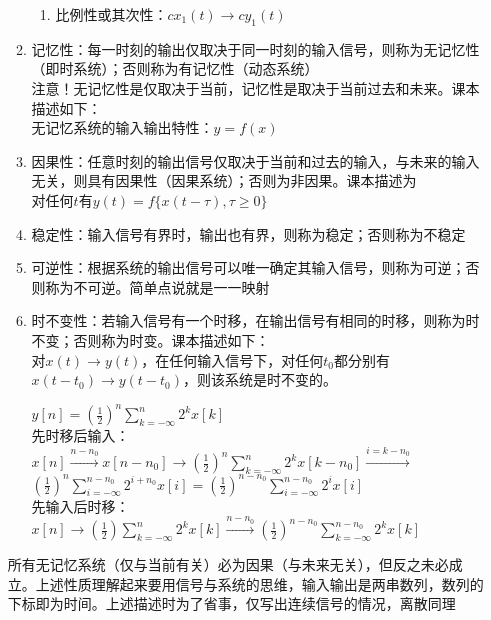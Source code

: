 \documentclass{article}
\begin{document}
\begin{enumerate}[label=(\arabic*)]
\begin{enumerate}[label=(\roman*)]
\begin{enumerate}[label=(\alph*)]
									\item 比例性或其次性：$cx_1(t)\to cy_1(t)$
								\end{enumerate}
					\item 记忆性：每一时刻的输出仅取决于同一时刻的输入信号，则称为{\red 无}记忆性（即时系统）；否则称为有记忆性（动态系统）\\
								{\red 注意！无记忆性是仅取决于当前，记忆性是取决于当前过去和未来}。课本描述如下：\\
								无记忆系统的输入输出特性：$y=f(x)$
					\item 因果性：任意时刻的输出信号仅取决于当前和过去的输入，与未来的输入无关，则具有因果性（因果系统）；否则为非因果。课本描述为\\
								对任何$t$有$y(t)=f\{x(t-\tau),\tau \geq 0\}$
					\item 稳定性：输入信号有界时，输出也有界，则称为稳定；否则称为不稳定
					\item 可逆性：根据系统的输出信号可以唯一确定其输入信号，则称为可逆；否则称为不可逆。简单点说就是一一映射
					\item 时不变性：若输入信号有一个时移，在输出信号有相同的时移，则称为时不变；否则称为时变。课本描述如下：\\
								对$x(t)\to y(t)$，在任何输入信号下，对任何$t_0$都分别有$x(t-t_0)\to y(t-t_0)$，则该系统是时不变的。
								\begin{example}
									$y[n] = (\frac{1}{2})^n\sum_{k=-\infty}^{n}2^kx[k]$\\
									先时移后输入：$x[n]\xrightarrow{n-n_0}x[n-n_0]\longrightarrow (\frac{1}{2})^n\sum_{k=-\infty}^{n}2^kx[k-n_0]\xrightarrow{i=k-n_0}$\\
									$(\frac{1}{2})^n\sum_{i=-\infty}^{n-n_0}2^{i+n_0}x[i] = (\frac{1}{2})^{n-n_0}\sum_{i=-\infty}^{n-n_0}2^ix[i]$\\
									先输入后时移：$x[n]\longrightarrow (\frac{1}{2})\sum_{k=-\infty}^{n}2^kx[k]\xrightarrow{n-n_0}(\frac{1}{2})^{n-n_0}\sum_{k=-\infty}^{n-n_0}2^kx[k]$
								\end{example}
				\end{enumerate}
				\begin{remark}
					所有无记忆系统（仅与当前有关）必为因果（与未来无关），但反之未必成立。上述性质理解起来要用信号与系统的思维，输入输出是两串数列，数列的下标即为时间。上述描述时为了省事，仅写出连续信号的情况，离散同理
				\end{remark}
\end{enumerate}
\end{document}
